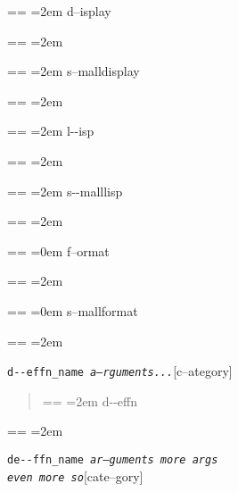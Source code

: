 \documentclass{book}
\makeatletter
\newenvironment{GNUTexinfopreformatted}{%
  \par\obeylines\obeyspaces\frenchspacing
  \parskip=\z@\parindent=\z@}{}
\makeatother
\begin{document}
\begin{GNUTexinfopreformatted}
\leftskip=2em\relax%
d--isplay
\end{GNUTexinfopreformatted}
\begin{GNUTexinfopreformatted}
\leftskip=2em\relax\ttfamily%

\end{GNUTexinfopreformatted}
\begin{GNUTexinfopreformatted}
\leftskip=2em\relax\footnotesize%
s--malldisplay
\end{GNUTexinfopreformatted}
\begin{GNUTexinfopreformatted}
\leftskip=2em\relax\ttfamily%

\end{GNUTexinfopreformatted}
\begin{GNUTexinfopreformatted}
\leftskip=2em\relax\ttfamily%
l{-}{-}isp
\end{GNUTexinfopreformatted}
\begin{GNUTexinfopreformatted}
\leftskip=2em\relax\ttfamily%

\end{GNUTexinfopreformatted}
\begin{GNUTexinfopreformatted}
\leftskip=2em\relax\ttfamily\footnotesize%
s{-}{-}malllisp
\end{GNUTexinfopreformatted}
\begin{GNUTexinfopreformatted}
\leftskip=2em\relax\ttfamily%

\end{GNUTexinfopreformatted}
\begin{GNUTexinfopreformatted}
\leftskip=0em\relax%
f--ormat
\end{GNUTexinfopreformatted}
\begin{GNUTexinfopreformatted}
\leftskip=2em\relax\ttfamily%

\end{GNUTexinfopreformatted}
\begin{GNUTexinfopreformatted}
\leftskip=0em\relax\footnotesize%
s--mallformat
\end{GNUTexinfopreformatted}
\begin{GNUTexinfopreformatted}
\leftskip=2em\relax\ttfamily%

\end{GNUTexinfopreformatted}
\noindent\texttt{d{-}{-}effn\_name \EmbracOn{}\textnormal{\textsl{a--rguments...}}\EmbracOff{}}\hfill[c--ategory]

%
\begin{quote}
\unskip{\parskip=0pt\noindent}%
\begin{GNUTexinfopreformatted}
\leftskip=2em\relax\ttfamily%
d{-}{-}effn
\end{GNUTexinfopreformatted}
\end{quote}
\begin{GNUTexinfopreformatted}
\leftskip=2em\relax\ttfamily%

\end{GNUTexinfopreformatted}
\noindent\texttt{de{-}{-}ffn\_name \EmbracOn{}\textnormal{\textsl{ar--guments    more args \leavevmode{}\\ even more so}}\EmbracOff{}}\hfill[cate--gory]
\end{document}
